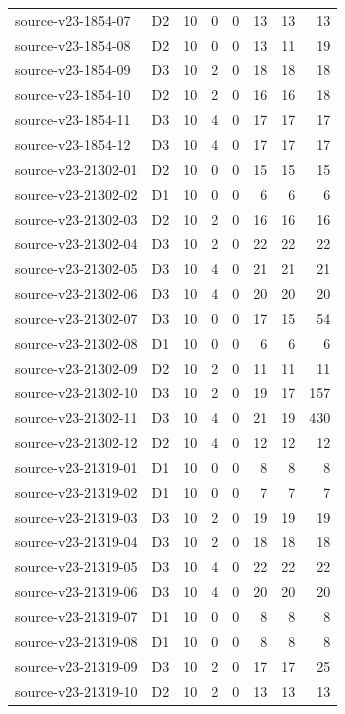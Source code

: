 \begin{longtable}{p{}lrrrrrr}
source-v23-1854-07 & D2 & 10 & 0 & 0 & 13 & 13 & 13\\
source-v23-1854-08 & D2 & 10 & 0 & 0 & 13 & 11 & 19\\
source-v23-1854-09 & D3 & 10 & 2 & 0 & 18 & 18 & 18\\
source-v23-1854-10 & D2 & 10 & 2 & 0 & 16 & 16 & 18\\
source-v23-1854-11 & D3 & 10 & 4 & 0 & 17 & 17 & 17\\
source-v23-1854-12 & D3 & 10 & 4 & 0 & 17 & 17 & 17\\
source-v23-21302-01 & D2 & 10 & 0 & 0 & 15 & 15 & 15\\
source-v23-21302-02 & D1 & 10 & 0 & 0 & 6 & 6 & 6\\
source-v23-21302-03 & D2 & 10 & 2 & 0 & 16 & 16 & 16\\
source-v23-21302-04 & D3 & 10 & 2 & 0 & 22 & 22 & 22\\
source-v23-21302-05 & D3 & 10 & 4 & 0 & 21 & 21 & 21\\
source-v23-21302-06 & D3 & 10 & 4 & 0 & 20 & 20 & 20\\
source-v23-21302-07 & D3 & 10 & 0 & 0 & 17 & 15 & 54\\
source-v23-21302-08 & D1 & 10 & 0 & 0 & 6 & 6 & 6\\
source-v23-21302-09 & D2 & 10 & 2 & 0 & 11 & 11 & 11\\
source-v23-21302-10 & D3 & 10 & 2 & 0 & 19 & 17 & 157\\
source-v23-21302-11 & D3 & 10 & 4 & 0 & 21 & 19 & 430\\
source-v23-21302-12 & D2 & 10 & 4 & 0 & 12 & 12 & 12\\
source-v23-21319-01 & D1 & 10 & 0 & 0 & 8 & 8 & 8\\
source-v23-21319-02 & D1 & 10 & 0 & 0 & 7 & 7 & 7\\
source-v23-21319-03 & D3 & 10 & 2 & 0 & 19 & 19 & 19\\
source-v23-21319-04 & D3 & 10 & 2 & 0 & 18 & 18 & 18\\
source-v23-21319-05 & D3 & 10 & 4 & 0 & 22 & 22 & 22\\
source-v23-21319-06 & D3 & 10 & 4 & 0 & 20 & 20 & 20\\
source-v23-21319-07 & D1 & 10 & 0 & 0 & 8 & 8 & 8\\
source-v23-21319-08 & D1 & 10 & 0 & 0 & 8 & 8 & 8\\
source-v23-21319-09 & D3 & 10 & 2 & 0 & 17 & 17 & 25\\
source-v23-21319-10 & D2 & 10 & 2 & 0 & 13 & 13 & 13\\

\end{longtable}
